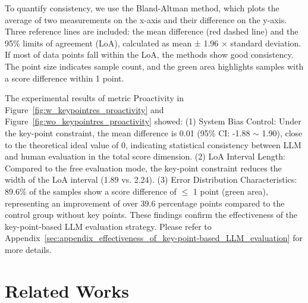 \documentclass[11pt]{article}
\begin{document}
To quantify consistency, we use the Bland-Altman method, which plots the average of two measurements on the x-axis and their difference on the y-axis. Three reference lines are included: the mean difference (red dashed line) and the 95\% limits of agreement (LoA), calculated as mean ± 1.96 × standard deviation. If most of data points fall within the LoA, the methods show good consistency. The point size indicates sample count, and the green area highlights samples with a score difference within 1 point.




The experimental results of metric Proactivity in Figure~\ref{fig:w_keypointres_proactivity} and Figure~\ref{fig:wo_keypointres_proactivity} showed: (1) System Bias Control: Under the key-point constraint, the mean difference is 0.01 (95\% CI: -1.88 $\sim$ 1.90), close to the theoretical ideal value of 0, indicating statistical consistency between LLM and human evaluation in the total score dimension. (2) LoA Interval Length: Compared to the free evaluation mode, the key-point constraint reduces the width of the LoA interval (1.89 vs. 2.24). (3) Error Distribution Characteristics: 89.6\% of the samples show a score difference of $\leq$ 1 point (green area), representing an improvement of over 39.6 percentage points compared to the control group without key points.
These findings confirm the effectiveness of the key-point-based LLM evaluation strategy.
Please refer to Appendix~\ref{sec:appendix_effectiveness_of_key-point-based_LLM_evaluation} for more details.




\section{Related Works}
\end{document}
